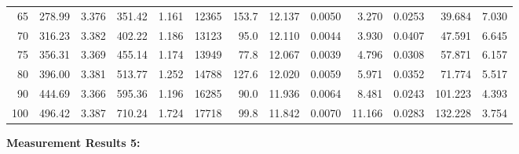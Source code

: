 \documentclass[10pt]{article}
\begin{document}
{\begin{tabular}{|r|rr|rr|rr|rr|rr|r|r|}
       65 &       278.99 &        3.376 &       351.42 &        1.161 &        12365 &        153.7 &       12.137 &       0.0050 &        3.270 &       0.0253 &       39.684 &        7.030 \\
       70 &       316.23 &        3.382 &       402.22 &        1.186 &        13123 &         95.0 &       12.110 &       0.0044 &        3.930 &       0.0407 &       47.591 &        6.645 \\
       75 &       356.31 &        3.369 &       455.14 &        1.174 &        13949 &         77.8 &       12.067 &       0.0039 &        4.796 &       0.0308 &       57.871 &        6.157 \\
       80 &       396.00 &        3.381 &       513.77 &        1.252 &        14788 &        127.6 &       12.020 &       0.0059 &        5.971 &       0.0352 &       71.774 &        5.517 \\
       90 &       444.69 &        3.366 &       595.36 &        1.196 &        16285 &         90.0 &       11.936 &       0.0064 &        8.481 &       0.0243 &      101.223 &        4.393 \\
      100 &       496.42 &        3.387 &       710.24 &        1.724 &        17718 &         99.8 &       11.842 &       0.0070 &       11.166 &       0.0283 &      132.228 &        3.754 \\
\hline
\end{tabular}
}

\vspace{3mm}

\noindent
{\large \bf Measurement Results 5:}
\vspace{3mm}
\end{document}

